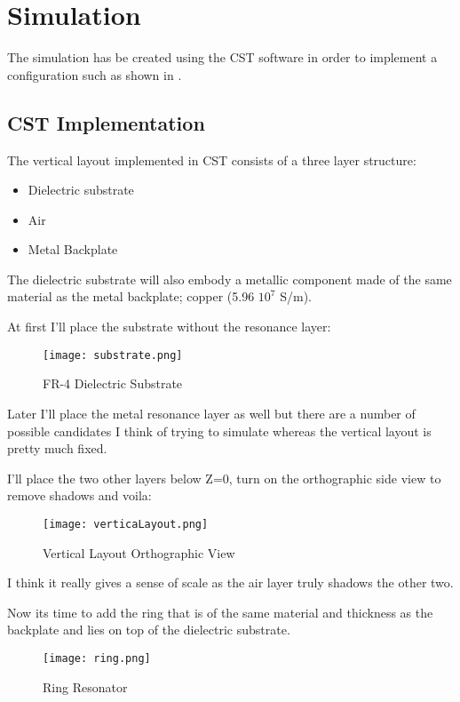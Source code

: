 \section{\textsf{Simulation}}
    The simulation has be created using the CST software in order to implement a configuration such as shown in \cite{zhang_design_2023}.

    \subsection{\textsf{CST Implementation}}
        The vertical layout implemented in CST consists of a three layer structure:
        \begin{itemize}
            \item Dielectric substrate
            \item Air
            \item Metal Backplate
        \end{itemize}

        The dielectric substrate will also embody a metallic component made of the same material as the metal backplate; copper
        (5.96 \mu $10^7$ S/m).

        At first I'll place the substrate without the resonance layer:  
        \begin{figure}[h]
            \centering
            \texttt{[image: substrate.png]}
            \caption{FR-4 Dielectric Substrate}
            \label{img:substrate}
        \end{figure}

        Later I'll place the metal resonance layer as well but there are a number of possible candidates
        I think of trying to simulate whereas the vertical layout is pretty much fixed.

        I'll place the two other layers below Z=0, turn on the orthographic side
        view to remove shadows and voila: 
        \begin{figure}[b]
            \centering
            \texttt{[image: verticaLayout.png]}
            \caption{Vertical Layout Orthographic View}
            \label{img:verticaLayout}
        \end{figure}
        I think it really gives a sense of scale as the air layer truly shadows the other two.

        Now its time to add the ring that is of the same material and thickness as the backplate and lies
        on top of the dielectric substrate. 
        \begin{figure}[b]
            \centering
            \texttt{[image: ring.png]}
            \caption{Ring Resonator}
            \label{img:ring}
        \end{figure}

